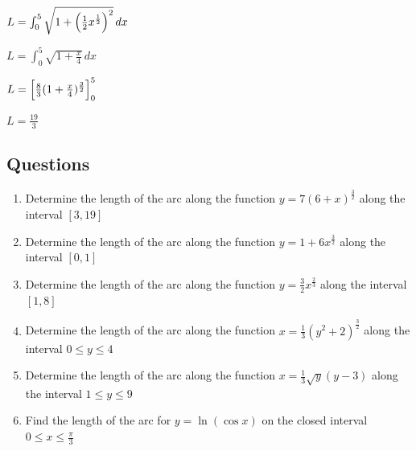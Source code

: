 \documentclass[../main.tex]{subfiles}
\begin{document}
$L=\int_0^5 \sqrt{1+\Bigl(\frac{1}{2}x^{\frac{1}{2}}\Bigr)^2}\,dx$

$L=\int_0^5 \sqrt{1+\frac{x}{4}}\,dx$

$L=\Bigl[\frac{8}{3}(1+\frac{x}{4})^{\frac{3}{2}}\Bigr]_0^5$

$L=\frac{19}{3}$

\pagebreak

\subsection*{Questions}
\label{Arc length}
\begin{enumerate}[itemsep=0.7cm]
    \item 
    Determine the length of the arc along the function $y=7(6+x)^{\frac{3}{2}}$ along the interval $[3,19]$

    \item
    Determine the length of the arc along the function $y=1+6x^{\frac{3}{2}}$ along the interval $[0,1]$

    \item 
    Determine the length of the arc along the function $y=\frac{3}{2}x^{\frac{2}{3}}$ along the interval $[1,8]$

    \item 
    Determine the length of the arc along the function $x=\frac{1}{3}(y^2+2)^{\frac{3}{2}}$ along the interval $0\leq y \leq 4$

    \item 
    Determine the length of the arc along the function $x=\frac{1}{3}\sqrt{y}(y-3)$ along the interval $1\leq y \leq 9$

    \item 
    Find the length of the arc for $y=\ln{(\cos{x})}$ on the closed interval $0 \leq x \leq \frac{\pi}{3}$

\end{enumerate}
\end{document}
